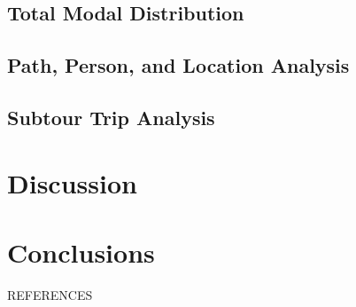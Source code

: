 \documentclass[12pt, oneside, openright]{byuthesis}
\begin{document}
\hypertarget{total-modal-distribution}{%
\section{Total Modal Distribution}\label{total-modal-distribution}}

\hypertarget{path-person-and-location-analysis}{%
\section{Path, Person, and Location Analysis}\label{path-person-and-location-analysis}}

\hypertarget{subtour-trip-analysis}{%
\section{Subtour Trip Analysis}\label{subtour-trip-analysis}}

\hypertarget{discussion}{%
\chapter{Discussion}\label{discussion}}

\hypertarget{conclusions}{%
\chapter{Conclusions}\label{conclusions}}

\cleardoublepage
    \begin{centering}
    REFERENCES\\
     \baselineskip
    \end{centering}
\end{document}
